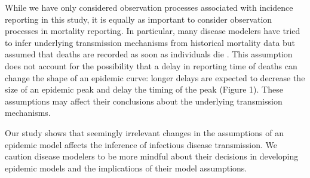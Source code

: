 \documentclass{article}\usepackage[]{graphicx}\usepackage[]{color}
\begin{document}
While we have only considered observation processes associated with incidence 
reporting in this study, it is equally as important to consider observation
processes in mortality reporting. In particular, many disease modelers have
tried to infer underlying transmission mechanisms from historical mortality 
data but assumed that deaths are recorded as soon as individuals die 
\citep{he2013inferring, didelot2017model, dean2018human}. 
This assumption does not account for the possibility 
that a delay in reporting time of deaths can
change the shape of an epidemic curve: longer delays are expected to decrease
the size of an epidemic peak and delay the timing of the peak (Figure 1). 
These assumptions may affect their conclusions about the underlying 
transmission mechanisms.

Our study shows that seemingly irrelevant changes in the assumptions of an epidemic
model affects the inference of infectious disease transmission.
We caution disease modelers to be more mindful about their decisions in developing
epidemic models and the implications of their model assumptions.


\end{document}
